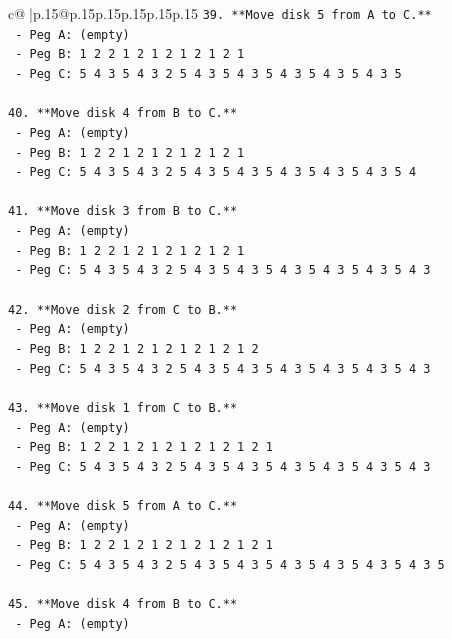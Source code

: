 \documentclass{article}
\begin{document}
{\begin{supertabular}{c@{$\;$}|p{.15\linewidth}@{}p{.15\linewidth}p{.15\linewidth}p{.15\linewidth}p{.15\linewidth}p{.15\linewidth}}
{{{\texttt{39. **Move disk 5 from A to C.**} \\
\texttt{    {-} Peg A: (empty)} \\
\texttt{    {-} Peg B: 1 2 2 1 2 1 2 1 2 1 2 1} \\
\texttt{    {-} Peg C: 5 4 3 5 4 3 2 5 4 3 5 4 3 5 4 3 5 4 3 5 4 3 5} \\
\\ 
\texttt{40. **Move disk 4 from B to C.**} \\
\texttt{    {-} Peg A: (empty)} \\
\texttt{    {-} Peg B: 1 2 2 1 2 1 2 1 2 1 2 1} \\
\texttt{    {-} Peg C: 5 4 3 5 4 3 2 5 4 3 5 4 3 5 4 3 5 4 3 5 4 3 5 4} \\
\\ 
\texttt{41. **Move disk 3 from B to C.**} \\
\texttt{    {-} Peg A: (empty)} \\
\texttt{    {-} Peg B: 1 2 2 1 2 1 2 1 2 1 2 1} \\
\texttt{    {-} Peg C: 5 4 3 5 4 3 2 5 4 3 5 4 3 5 4 3 5 4 3 5 4 3 5 4 3} \\
\\ 
\texttt{42. **Move disk 2 from C to B.**} \\
\texttt{    {-} Peg A: (empty)} \\
\texttt{    {-} Peg B: 1 2 2 1 2 1 2 1 2 1 2 1 2} \\
\texttt{    {-} Peg C: 5 4 3 5 4 3 2 5 4 3 5 4 3 5 4 3 5 4 3 5 4 3 5 4 3} \\
\\ 
\texttt{43. **Move disk 1 from C to B.**} \\
\texttt{    {-} Peg A: (empty)} \\
\texttt{    {-} Peg B: 1 2 2 1 2 1 2 1 2 1 2 1 2 1} \\
\texttt{    {-} Peg C: 5 4 3 5 4 3 2 5 4 3 5 4 3 5 4 3 5 4 3 5 4 3 5 4 3} \\
\\ 
\texttt{44. **Move disk 5 from A to C.**} \\
\texttt{    {-} Peg A: (empty)} \\
\texttt{    {-} Peg B: 1 2 2 1 2 1 2 1 2 1 2 1 2 1} \\
\texttt{    {-} Peg C: 5 4 3 5 4 3 2 5 4 3 5 4 3 5 4 3 5 4 3 5 4 3 5 4 3 5} \\
\\ 
\texttt{45. **Move disk 4 from B to C.**} \\
\texttt{    {-} Peg A: (empty)} \\
}}}
\end{supertabular}}
\end{document}
